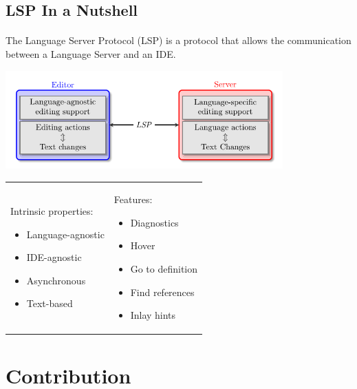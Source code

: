 \documentclass[9pt,xcolor=table,svgnames]{beamer}
\begin{document}
\subsection[In a Nutshell]{LSP In a Nutshell}
\begin{frame}{\secname}
    \framesubtitle{\subsecname}

    The \alert{Language Server Protocol} (LSP) is a protocol that allows the communication between a \alert{Language Server} and an \alert{IDE}.

    \pause

    \begin{center}
    \includegraphics[width=0.8\textwidth]{figs/lsp-diagram.pdf}
    \end{center}

    \begin{tabular}{p{} p{}}
    Intrinsic properties:
    \begin{itemize}
        \item Language-agnostic
        \item IDE-agnostic
        \item Asynchronous
        \item Text-based
    \end{itemize}
        &
    Features:
    \begin{itemize}
        \item Diagnostics
        \item Hover
        \item Go to definition
        \item Find references
        \item Inlay hints
    \end{itemize}
    \end{tabular}
\end{frame}


\section[Contribution]{Contribution}
\end{document}
